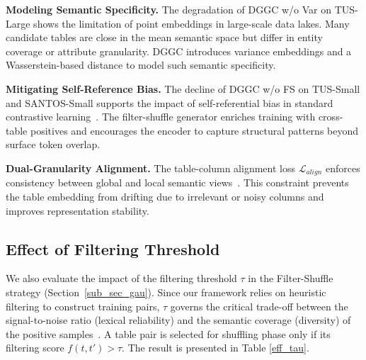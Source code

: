 \noindent\textbf{Modeling Semantic Specificity.} The degradation of DGGC w/o Var on TUS-Large shows the limitation of point embeddings in large-scale data lakes. Many candidate tables are close in the mean semantic space but differ in entity coverage or attribute granularity. DGGC introduces variance embeddings and a Wasserstein-based distance to model such semantic specificity.

\noindent\textbf{Mitigating Self-Reference Bias.} The decline of DGGC w/o FS on TUS-Small and SANTOS-Small supports the impact of self-referential bias in standard contrastive learning~\cite{robinson2021contrastive}. The filter-shuffle generator enriches training with cross-table positives and encourages the encoder to capture structural patterns beyond surface token overlap.

\noindent\textbf{Dual-Granularity Alignment.} The table-column alignment loss \(\mathcal{L}_{align}\) enforces consistency between global and local semantic views~\cite{hjelm2018learning}. This constraint prevents the table embedding from drifting due to irrelevant or noisy columns and improves representation stability.


\iffalse

\subsection{Effect of Filtering Threshold}

We also evaluate the impact of the filtering threshold $\tau$ in the Filter-Shuffle strategy (Section~\ref{sub_sec_gau}). Since our framework relies on heuristic filtering to construct training pairs, $\tau$ governs the critical trade-off between the signal-to-noise ratio (lexical reliability) and the semantic coverage (diversity) of the positive samples~\cite{dehghani2017neural}. A table pair is selected for shuffling phase only if its filtering score $f(t,t') > \tau$. The result is presented in Table \ref{eff_tau}.

